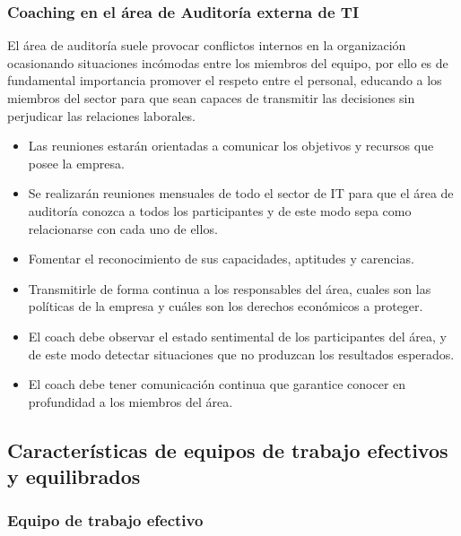         \subsubsection{Coaching en el área de Auditoría externa de TI}        
        El área de auditoría  suele provocar conflictos internos en la organización ocasionando situaciones incómodas entre los miembros del equipo, por ello es de fundamental importancia promover el respeto entre el personal, educando a los miembros del sector para que sean capaces de transmitir las decisiones sin perjudicar las relaciones laborales.
        \begin{itemize}
	        \item Las reuniones estarán orientadas a comunicar los objetivos y recursos que posee la empresa.
            \item Se realizarán reuniones mensuales de todo el sector de IT para que el área de auditoría conozca a todos los participantes y de este modo sepa como relacionarse con cada uno de ellos.
            \item Fomentar el reconocimiento de sus capacidades, aptitudes y carencias.
            \item Transmitirle de forma continua a los responsables del área, cuales son las políticas de la empresa y cuáles son los derechos económicos a proteger.
            \item  El coach debe observar el estado sentimental de los participantes del área, y de este modo detectar situaciones que no produzcan los resultados esperados.
            \item El coach debe tener comunicación continua que garantice conocer en profundidad a los miembros del área.
            
        \end{itemize}



\newpage

    \subsection{Características de equipos de trabajo efectivos y equilibrados} %
    

\subsubsection{Equipo de trabajo efectivo}

